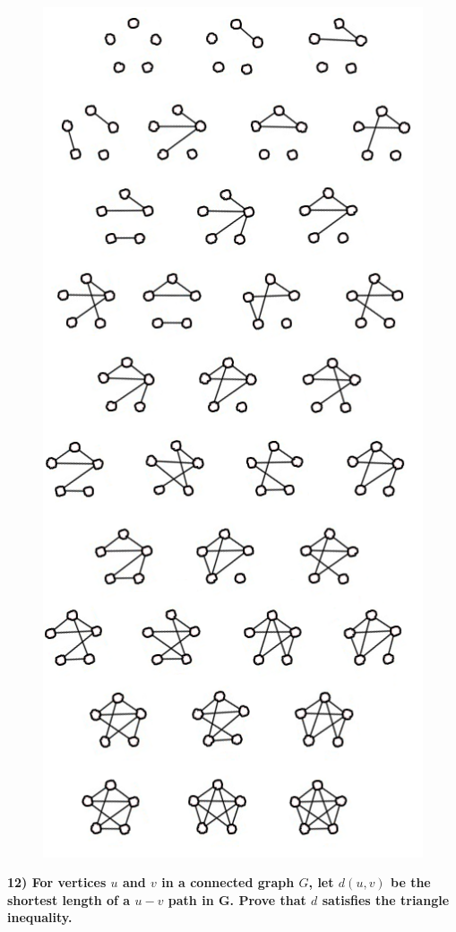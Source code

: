 \documentclass[]{article}
\begin{document}
\begin{figure}[h]
	\begin{center}
		\includegraphics[scale=1.75]{image/graph.png}
	\end{center}
\end{figure}

\newpage

\noindent \textbf{12) For vertices $u$ and $v$ in a connected graph $G$, let $d(u, v)$ be the shortest length of a $u-v$ path in G. Prove that $d$ satisfies the triangle inequality.} 
\end{document}
